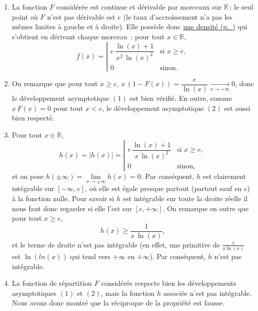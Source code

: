 \begin{enumerate}
\def\labelenumi{\arabic{enumi}.}
\setcounter{enumi}{4}
\item
  La fonction \(F\) considérée est continue et dérivable par morceaux
  sur \(\mathbb{R}\)\,; le seul point où \(F\) n'est pas dérivable est
  \(e\) (le taux d'accroissement n'a pas les mêmes limites à gauche et à
  droite). Elle possède donc \protect\hyperref[I-fdr-va-dens]{une
  densité (p.~\pageref*{I-fdr-va-dens})} qui s'obtient en dérivant
  chaque morceau~: pour tout \(x\in\mathbb{R}\),
  \[f(x) = \left|\begin{array}{ll} e\,\dfrac{\ln(x) + 1}{x^2\,\ln(x)^2} & \text{si } x \geq e,\\ 0 & \text{sinon.}\end{array}\right.\]
\item
  On remarque que pour tout \(x\geq e\),
  \(x\,\left(1-F(x)\right) = \dfrac{e}{\ln(x)} \xrightarrow[x\to+\infty]{} 0\),
  donc le développement asymptotique \((1)\) est bien vérifié. En outre,
  comme \(x\,F(x) = 0\) pour tout \(x < e\), le développement
  asymptotique \((2)\) est aussi bien respecté.
\item
  Pour tout \(x\in\mathbb{R}\),
  \[ h(x) = \left|h(x)\right| = \left|\begin{array}{ll} e\,\dfrac{\ln(x) + 1}{x\,\ln(x)^2} & \text{si } x \geq e,\\ 0 & \text{sinon,} \end{array}\right.\]
  et on pose \(h(\pm\infty) = \lim\limits_{x\to\pm\infty}h(x) = 0\). Par
  conséquent, \(h\) est clairement intégrable sur \([-\infty,e]\), où
  elle est égale presque partout (partout sauf en \(e\)) à la fonction
  nulle. Pour savoir si \(h\) est intégrable sur toute la droite réelle
  il nous faut donc regarder si elle l'est sur \([e,+\infty]\). On
  remarque en outre que pour tout \(x\geq e\),
  \[h(x) \geq \dfrac{1}{x\,\ln(x)}, \] et le terme de droite n'est pas
  intégrable (en effet, une primitive de \(\frac1{x \ln(x)}\) est
  \(\ln(ln(x))\) qui tend vers \(+\infty\) en \(+\infty\)). Par
  conséquent, \(h\) n'est pas intégrable.
\item
  La fonction de répartition \(F\) considérée respecte bien les
  développements asymptotiques \((1)\) et \((2)\), mais la fonction
  \(h\) associée n'est pas intégrable. Nous avons donc montré que la
  réciproque de la propriété est fausse.
\end{enumerate}

\label{I-answer-dlfdr-liensdl}

